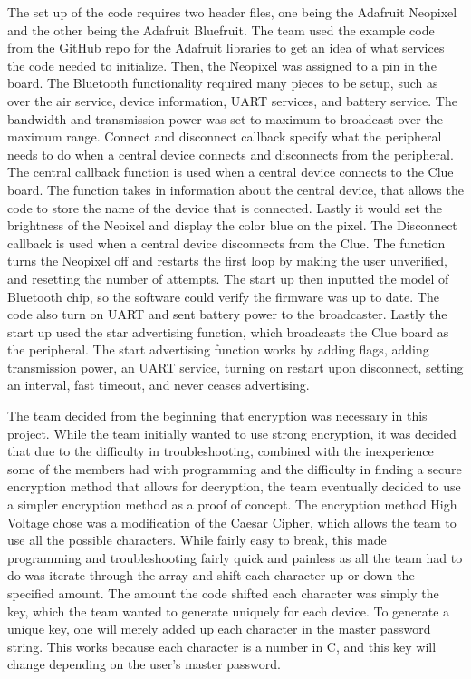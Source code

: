 \documentclass[12pt]{article}
\begin{document}
\hspace{1cm}The set up of the code requires two header files, one being the Adafruit Neopixel  and the other being the Adafruit Bluefruit. The team used the example code from the GitHub repo for the Adafruit libraries \cite{bleuartcode} to get an idea of what services the code needed to initialize. Then, the Neopixel was assigned to a pin in the board. The Bluetooth functionality required many pieces to be setup, such as over the air service, device information, UART services, and battery service. The bandwidth and transmission power was set to maximum to broadcast over the maximum range. Connect and disconnect callback specify what the peripheral needs to do when a central device connects and disconnects from the peripheral. The central callback function is used when a central device connects to the Clue board. The function takes in information about the central device, that allows the code to store the name of the device that is connected. Lastly it would set the brightness of the Neoixel and display the color blue on the pixel. The Disconnect callback is used when a central device disconnects from the Clue. The function turns the Neopixel off and restarts the first loop by making the user unverified, and resetting the number of attempts. The start up then inputted the model of Bluetooth chip, so the software could verify the firmware was up to date. The code also turn on UART and sent battery power to the broadcaster. Lastly the start up used the star advertising function, which broadcasts the Clue board as the peripheral. The start advertising function works by adding flags, adding transmission power, an UART service, turning on restart upon disconnect, setting an interval, fast timeout, and never ceases advertising. 

\hspace{1cm}The team decided from the beginning that encryption was necessary in this project. While the team initially wanted to use strong encryption, it was decided that due to the difficulty in troubleshooting, combined with the inexperience some of the members had with programming and the difficulty in finding a secure encryption method that allows for decryption, the team eventually decided to use a simpler encryption method as a proof of concept. The encryption method High Voltage chose was a modification of the Caesar Cipher\cite{caesarcipher}, which allows the team to use all the possible characters. While fairly easy to break, this made programming and troubleshooting fairly quick and painless as all the team had to do was iterate through the array and shift each character up or down the specified amount. The amount the code shifted each character was simply the key, which the team wanted to generate uniquely for each device. To generate a unique key, one will merely added up each character in the master password string. This works because each character is a number in C, and this key will change depending on the user's master password.
\end{document}
